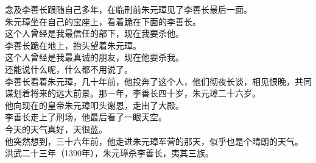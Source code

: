 \begin{multicols}{\theparacolNo}
念及李善长跟随自己多年，在临刑前朱元璋见了李善长最后一面。\\

朱元璋坐在自己的宝座上，看着跪在下面的李善长。\\

这个人曾经是我最信任的部下，现在我要杀他。\\

李善长跪在地上，抬头望着朱元璋。\\

这个人曾经是我最真诚的朋友，现在他要杀我。\\

还能说什么呢，什么都不用说了。\\

李善长看着朱元璋，几十年前，他投奔了这个人，他们彻夜长谈，相见恨晚，共同谋划着将来的远大前景。那一年，李善长四十岁，朱元璋二十六岁。\\

他向现在的皇帝朱元璋叩头谢恩，走出了大殿。\\

李善长走上了刑场，他最后看了一眼天空。\\

今天的天气真好，天很蓝。\\

他突然想到，三十六年前，他走进朱元璋军营的那天，似乎也是个晴朗的天气。\\

洪武二十三年（1390年），朱元璋杀李善长，夷其三族。\\
\ifnum{}
	\end{multicols}
\fi
\newpage
